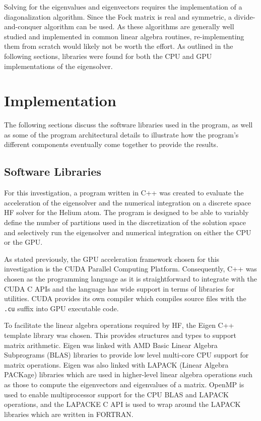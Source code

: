 \documentclass[conference, twoside]{IEEEtran}
\begin{document}
Solving for the eigenvalues and eigenvectors requires the implementation of a diagonalization algorithm. Since the Fock matrix is real and symmetric, a divide-and-conquer algorithm can be used. As these algorithms are generally well studied and implemented in common linear algebra routines, re-implementing them from scratch would likely not be worth the effort. As outlined in the following sections, libraries were found for both the CPU and GPU implementations of the eigensolver.

\section{Implementation} %

The following sections discuss the software libraries used in the program, as well as some of the program architectural details to illustrate how the program's different components eventually come together to provide the results.

\subsection{Software Libraries} %

For this investigation, a program written in C++ was created to evaluate the acceleration of the eigensolver and the numerical integration on a discrete space HF solver for the Helium atom. The program is designed to be able to variably define the number of partitions used in the discretization of the solution space and selectively run the eigensolver and numerical integration on either the CPU or the GPU.

As stated previously, the GPU acceleration framework chosen for this investigation is the CUDA Parallel Computing Platform. Consequently, C++ was chosen as the programming language as it is straightforward to integrate with the CUDA C APIs and the language has wide support in terms of libraries for utilities. CUDA provides its own compiler which compiles source files with the \texttt{.cu} suffix into GPU executable code.

To facilitate the linear algebra operations required by HF, the Eigen \cite{eigen} C++ template library was chosen. This provides structures and types to support matrix arithmetic. Eigen was linked with AMD Basic Linear Algebra Subprograms (BLAS) libraries \cite{amd-blas} to provide low level multi-core CPU support for matrix operations. Eigen was also linked with LAPACK (Linear Algebra PACKage) \cite{lapack} libraries which are used in higher-level linear algebra operations such as those to compute the eigenvectors and eigenvalues of a matrix. OpenMP is used to enable multiprocessor support for the CPU BLAS and LAPACK operations, and the LAPACKE C API is used to wrap around the LAPACK libraries which are written in FORTRAN.
\end{document}
